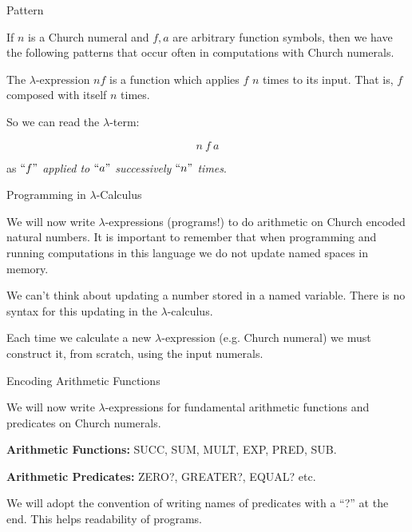 \documentclass{beamer}
\begin{document}
\begin{frame}{Pattern}

    If $n$ is a Church numeral and $f,a$ are arbitrary function symbols, then we have the following patterns that occur often in computations with Church numerals. 
    
    \vspace{0.3cm}
    
    The $\lambda$-expression $nf$ is a function which applies $f$ $n$ times to its input. That is, $f$ composed with itself $n$ times. 
    
    \vspace{0.3cm}
    
    So we can read the $\lambda$-term:
	
	$$n \ f \ a$$ 
	
	as \emph{$``f"$ applied to $``a"$ successively $``n"$ times}.
    
\end{frame}

\begin{frame}{Programming in $\lambda$-Calculus}

  We will now write $\lambda$-expressions (programs!) to do arithmetic on Church encoded natural numbers. It is important to remember that when programming and running computations in this language we do not update named spaces in memory. 
  
  \vspace{0.5cm}
  
  We can't think about updating a number stored in a named variable. There is no syntax for this updating in the $\lambda$-calculus.
  
  \vspace{0.5cm}
  
  Each time we calculate a new $\lambda$-expression (e.g. Church numeral) we must construct it, from scratch, using the input numerals. 
  
\end{frame}

\begin{frame}{Encoding Arithmetic Functions}

  We will now write $\lambda$-expressions for fundamental arithmetic functions and predicates on Church numerals.
  
  {\bf Arithmetic Functions: } SUCC, SUM, MULT, EXP, PRED, SUB.

  \vspace{1cm}  
  
  {\bf Arithmetic Predicates:} ZERO?, GREATER?, EQUAL? etc.

  \vspace{2cm}

  We will adopt the convention of writing names of predicates with a ``?'' at the end. This helps readability of programs. 
  
\end{frame}
\end{document}
